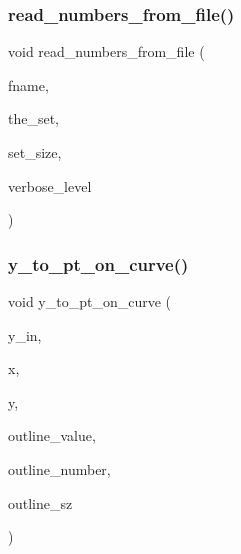 \mbox{\label{plot_8_c_a64bd882969853f5dc5980d1588c9fb5f}} 
\subsubsection{\texorpdfstring{read\+\_\+numbers\+\_\+from\+\_\+file()}{read\_numbers\_from\_file()}}
{\footnotesize\ttfamily void read\+\_\+numbers\+\_\+from\+\_\+file (\begin{DoxyParamCaption}\item[{const \mbox{\hyperlink{galois_8h_ab6cc7b4aeb6ea31aba2b3fbfc83ff5e6}{B\+Y\+TE}} $\ast$}]{fname,  }\item[{\mbox{\hyperlink{galois_8h_a09fddde158a3a20bd2dcadb609de11dc}{I\+NT}} $\ast$\&}]{the\+\_\+set,  }\item[{\mbox{\hyperlink{galois_8h_a09fddde158a3a20bd2dcadb609de11dc}{I\+NT}} \&}]{set\+\_\+size,  }\item[{\mbox{\hyperlink{galois_8h_a09fddde158a3a20bd2dcadb609de11dc}{I\+NT}}}]{verbose\+\_\+level }\end{DoxyParamCaption})}

\mbox{\label{plot_8_c_a25cd8bb49967f4fc27a128f5488831ce}} 
\subsubsection{\texorpdfstring{y\+\_\+to\+\_\+pt\+\_\+on\+\_\+curve()}{y\_to\_pt\_on\_curve()}}
{\footnotesize\ttfamily void y\+\_\+to\+\_\+pt\+\_\+on\+\_\+curve (\begin{DoxyParamCaption}\item[{\mbox{\hyperlink{galois_8h_a09fddde158a3a20bd2dcadb609de11dc}{I\+NT}}}]{y\+\_\+in,  }\item[{\mbox{\hyperlink{galois_8h_a09fddde158a3a20bd2dcadb609de11dc}{I\+NT}} \&}]{x,  }\item[{\mbox{\hyperlink{galois_8h_a09fddde158a3a20bd2dcadb609de11dc}{I\+NT}} \&}]{y,  }\item[{\mbox{\hyperlink{galois_8h_a09fddde158a3a20bd2dcadb609de11dc}{I\+NT}} $\ast$}]{outline\+\_\+value,  }\item[{\mbox{\hyperlink{galois_8h_a09fddde158a3a20bd2dcadb609de11dc}{I\+NT}} $\ast$}]{outline\+\_\+number,  }\item[{\mbox{\hyperlink{galois_8h_a09fddde158a3a20bd2dcadb609de11dc}{I\+NT}}}]{outline\+\_\+sz }\end{DoxyParamCaption})}

